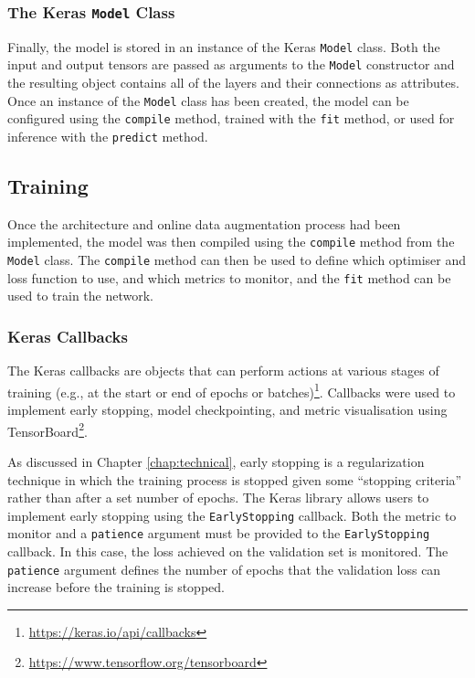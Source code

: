 \subsubsection{The Keras \texttt{Model} Class}

Finally, the model is stored in an instance of the Keras \texttt{Model} class. Both the input and output tensors are passed as arguments to the \texttt{Model} constructor and the resulting object contains all of the layers and their connections as attributes. Once an instance of the \texttt{Model} class has been created, the model can be configured using the \texttt{compile} method, trained with the \texttt{fit} method, or used for inference with the \texttt{predict} method.

\subsection{Training}

Once the architecture and online data augmentation process had been implemented, the model was then compiled using the \texttt{compile} method from the \texttt{Model} class. The \texttt{compile} method can then be used to define which optimiser and loss function to use, and which metrics to monitor, and the \texttt{fit} method can be used to train the network.

\subsubsection{Keras Callbacks}

The Keras callbacks are objects that can perform actions at various stages of training (e.g., at the start or end of epochs or batches)\footnote{\url{https://keras.io/api/callbacks}}. Callbacks were used to implement early stopping, model checkpointing, and metric visualisation using TensorBoard\footnote{\url{https://www.tensorflow.org/tensorboard}}.

As discussed in Chapter \ref{chap:technical}, early stopping is a regularization technique in which the training process is stopped given some ``stopping criteria'' rather than after a set number of epochs. The Keras library allows users to implement early stopping using the \texttt{EarlyStopping} callback. Both the metric to monitor and a \texttt{patience} argument must be provided to the \texttt{EarlyStopping} callback. In this case, the loss achieved on the validation set is monitored. The \texttt{patience} argument defines the number of epochs that the validation loss can increase before the training is stopped.

